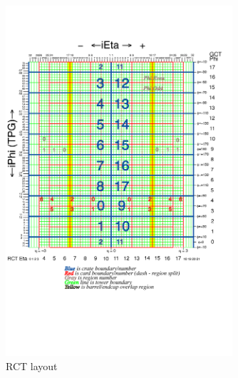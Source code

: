 \begin{figure}[t]
  \centering
	\includegraphics[trim = 0mm 80mm 0mm 42mm, clip, width=0.75\textwidth]{images/towers_ieta_iphi.png}
  	\caption[RCT Layout]
   	{RCT layout}
	\label{fig:rctTowerIetaIphi}
\end{figure}

